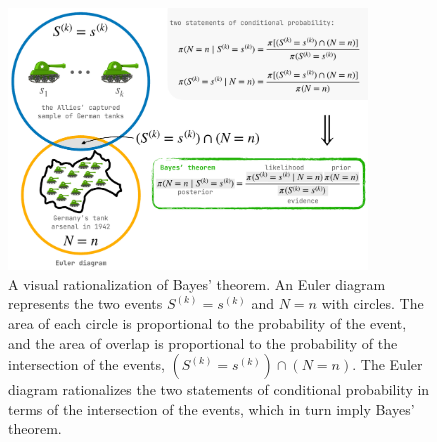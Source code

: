 \documentclass[11pt, oneside]{article}
\begin{document}
\begin{figure}[h!]
	\centering
	\includegraphics[width=0.85\textwidth]{gtp_fig0.pdf} 
	\caption{A visual rationalization of Bayes' theorem. 
	An Euler diagram \cite{ottley2012visually,micallef2012assessing} represents the two events $S^{(k)}=s^{(k)}$ and $N=n$ with circles. The area of each circle is proportional to the probability of the event, and the area of overlap is proportional to the probability of the intersection of the events, $(S^{(k)}=s^{(k)}) \cap (N=n)$.
	The Euler diagram rationalizes the two statements of conditional probability in terms of the intersection of the events, which in turn imply Bayes' theorem. \cite{kruschke2014doing}
	} \label{fig:bayes}
\end{figure}
\end{document}
